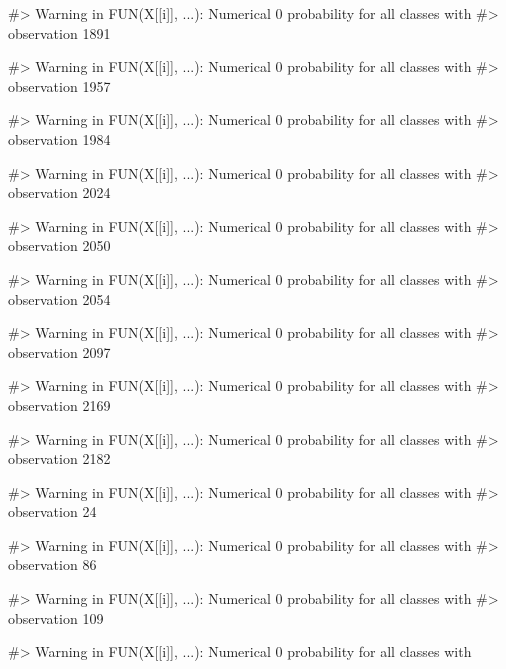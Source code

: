 \begin{Schunk}
\begin{Soutput}
#> Warning in FUN(X[[i]], ...): Numerical 0 probability for all classes with
#> observation 1891
\end{Soutput}
\begin{Soutput}
#> Warning in FUN(X[[i]], ...): Numerical 0 probability for all classes with
#> observation 1957
\end{Soutput}
\begin{Soutput}
#> Warning in FUN(X[[i]], ...): Numerical 0 probability for all classes with
#> observation 1984
\end{Soutput}
\begin{Soutput}
#> Warning in FUN(X[[i]], ...): Numerical 0 probability for all classes with
#> observation 2024
\end{Soutput}
\begin{Soutput}
#> Warning in FUN(X[[i]], ...): Numerical 0 probability for all classes with
#> observation 2050
\end{Soutput}
\begin{Soutput}
#> Warning in FUN(X[[i]], ...): Numerical 0 probability for all classes with
#> observation 2054
\end{Soutput}
\begin{Soutput}
#> Warning in FUN(X[[i]], ...): Numerical 0 probability for all classes with
#> observation 2097
\end{Soutput}
\begin{Soutput}
#> Warning in FUN(X[[i]], ...): Numerical 0 probability for all classes with
#> observation 2169
\end{Soutput}
\begin{Soutput}
#> Warning in FUN(X[[i]], ...): Numerical 0 probability for all classes with
#> observation 2182
\end{Soutput}
\begin{Soutput}
#> Warning in FUN(X[[i]], ...): Numerical 0 probability for all classes with
#> observation 24
\end{Soutput}
\begin{Soutput}
#> Warning in FUN(X[[i]], ...): Numerical 0 probability for all classes with
#> observation 86
\end{Soutput}
\begin{Soutput}
#> Warning in FUN(X[[i]], ...): Numerical 0 probability for all classes with
#> observation 109
\end{Soutput}
\begin{Soutput}
#> Warning in FUN(X[[i]], ...): Numerical 0 probability for all classes with

\end{Soutput}
\end{Schunk}
